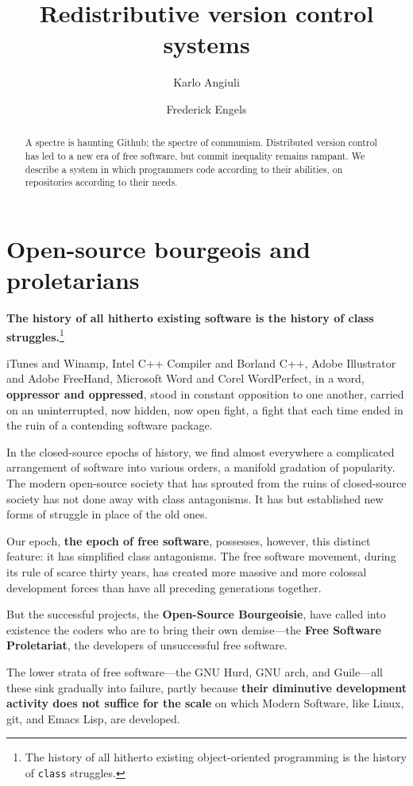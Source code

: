 \documentclass[10pt]{article}
\title{Redistributive version control systems}
\author{Karlo Angiuli \and Frederick Engels}
\begin{document}
\maketitle

\begin{abstract}\noindent
A spectre is haunting Github; the spectre of communism. Distributed version
control has led to a new era of free software, but commit inequality remains
rampant. We describe a system in which programmers code according to their
abilities, on repositories according to their needs. 
\end{abstract}

\section{Open-source bourgeois and proletarians}

\textbf{The history of all hitherto existing software is the history of class
struggles.}\footnote{The history of all hitherto existing object-oriented
programming is the history of \texttt{class} struggles.}

iTunes and Winamp,
Intel C++ Compiler and Borland C++,
Adobe Illustrator and Adobe FreeHand,
Microsoft Word and Corel WordPerfect,
in a word, \textbf{oppressor and oppressed}, stood in constant opposition to one
another, carried on an uninterrupted, now hidden, now open fight, a fight that
each time ended in the ruin of a contending software package.

In the closed-source epochs of history, we find almost everywhere a complicated
arrangement of software into various orders, a manifold gradation of popularity.
The modern open-source society that has sprouted from the ruins of closed-source
society has not done away with class antagonisms. It has but established new
forms of struggle in place of the old ones.

Our epoch, \textbf{the epoch of free software}, possesses, however, this
distinct feature: it has simplified class antagonisms. The free software
movement, during its rule of scarce thirty years, has created more massive and
more colossal development forces than have all preceding generations together.

But the successful projects, the \textbf{Open-Source Bourgeoisie}, have called
into existence the coders who are to bring their own demise---the \textbf{Free
Software Proletariat}, the developers of unsuccessful free software.

The lower strata of free software---the GNU Hurd, GNU arch, and Guile---all
these sink gradually into failure, partly because \textbf{their diminutive
development activity does not suffice for the scale} on which Modern Software,
like Linux, git, and Emacs Lisp, are developed.
\end{document}

